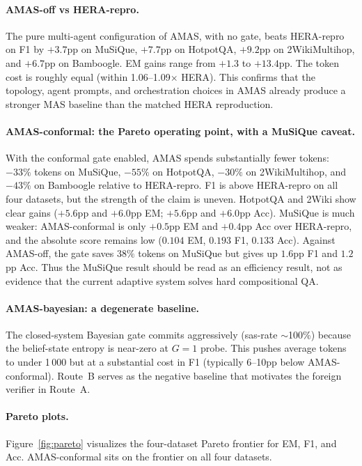 \documentclass[11pt]{article}
\newcommand{\amas}{AMAS\xspace}
\newcommand{\hera}{HERA\xspace}
\newcommand{\mas}{MAS\xspace}
\begin{document}
\paragraph{\amas-off vs \hera-repro.}
The pure multi-agent configuration of \amas, with no gate, beats \hera-repro
on F1 by $+3.7$pp on MuSiQue, $+7.7$pp on HotpotQA, $+9.2$pp on
2WikiMultihop, and $+6.7$pp on Bamboogle. EM gains range from $+1.3$ to
$+13.4$pp. The token cost is roughly equal (within 1.06--1.09$\times$
\hera). This confirms that the topology, agent prompts, and orchestration
choices in \amas already produce a stronger \mas baseline than the matched
\hera reproduction.

\paragraph{\amas-conformal: the Pareto operating point, with a MuSiQue caveat.}
With the conformal gate enabled, \amas spends substantially fewer tokens:
$-33\%$ tokens on MuSiQue, $-55\%$ on HotpotQA, $-30\%$ on 2WikiMultihop,
and $-43\%$ on Bamboogle relative to \hera-repro. F1 is above \hera-repro
on all four datasets, but the strength of the claim is uneven. HotpotQA
and 2Wiki show clear gains ($+5.6$pp and $+6.0$pp EM; $+5.6$pp and
$+6.0$pp Acc). MuSiQue is much weaker: \amas-conformal is only $+0.5$pp EM
and $+0.4$pp Acc over \hera-repro, and the absolute score remains low
($0.104$ EM, $0.193$ F1, $0.133$ Acc). Against \amas-off, the gate saves
$38\%$ tokens on MuSiQue but gives up $1.6$pp F1 and $1.2$pp Acc. Thus the
MuSiQue result should be read as an efficiency result, not as evidence that
the current adaptive system solves hard compositional QA.

\paragraph{\amas-bayesian: a degenerate baseline.}
The closed-system Bayesian gate commits aggressively (sas-rate $\sim$100\%)
because the belief-state entropy is near-zero at $G=1$ probe. This pushes
average tokens to under 1\,000 but at a substantial cost in F1 (typically
6--10pp below \amas-conformal). Route~B serves as the negative baseline
that motivates the foreign verifier in Route~A.

\paragraph{Pareto plots.}
Figure~\ref{fig:pareto} visualizes the four-dataset Pareto frontier for EM,
F1, and Acc. \amas-conformal sits on the frontier on all four datasets.
\end{document}
